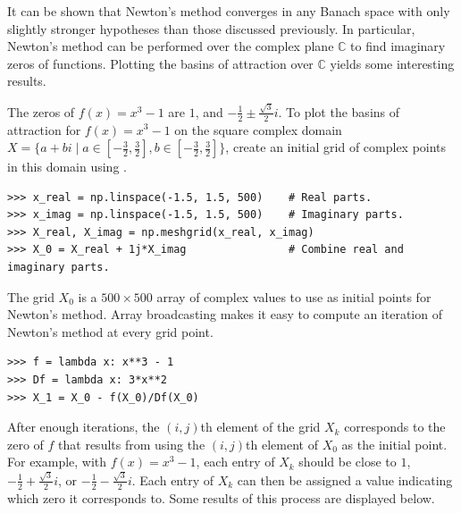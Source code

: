 It can be shown that Newton's method converges in any Banach space with only slightly stronger hypotheses than those discussed previously. %
In particular, Newton's method can be performed over the complex plane $\mathbb{C}$ to find imaginary zeros of functions.
Plotting the basins of attraction over $\mathbb{C}$ yields some interesting results.

The zeros of $f(x) = x^3 - 1$ are $1$, and $-\frac{1}{2} \pm \frac{\sqrt{3}}{2}i$.
To plot the basins of attraction for $f(x) = x^3-1$ on the square complex domain $X = \{a+bi \mid a \in [-\frac{3}{2},\frac{3}{2}], b \in [-\frac{3}{2},\frac{3}{2}]\}$,
create an initial grid of complex points in this domain using .

\begin{lstlisting}
>>> x_real = np.linspace(-1.5, 1.5, 500)    # Real parts.
>>> x_imag = np.linspace(-1.5, 1.5, 500)    # Imaginary parts.
>>> X_real, X_imag = np.meshgrid(x_real, x_imag)
>>> X_0 = X_real + 1j*X_imag                # Combine real and imaginary parts.
\end{lstlisting}

The grid $X_0$ is a $500\times500$ array of complex values to use as initial points for Newton's method.
Array broadcasting makes it easy to compute an iteration of Newton's method at every grid point.

\begin{lstlisting}
>>> f = lambda x: x**3 - 1
>>> Df = lambda x: 3*x**2
>>> X_1 = X_0 - f(X_0)/Df(X_0)
\end{lstlisting}

After enough iterations, the $(i,j)$th element of the grid $X_k$ corresponds to the zero of $f$ that results from using the $(i,j)$th element of $X_0$ as the initial point.
For example, with $f(x) = x^3 - 1$, each entry of $X_k$ should be close to $1$, $-\frac{1}{2} + \frac{\sqrt{3}}{2}i$, or $-\frac{1}{2} - \frac{\sqrt{3}}{2}i$.
Each entry of $X_k$ can then be assigned a value indicating which zero it corresponds to.
Some results of this process are displayed below.

